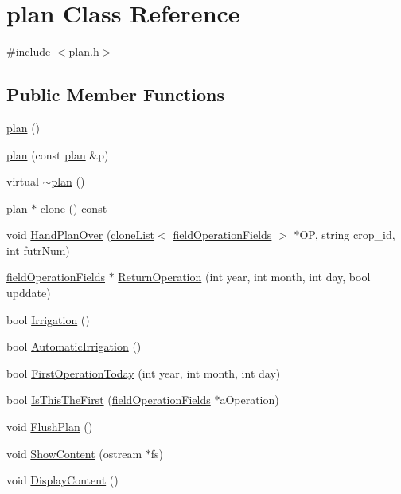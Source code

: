\hypertarget{classplan}{
\section{plan Class Reference}
\label{classplan}
}


{\ttfamily \#include $<$plan.h$>$}\subsection*{Public Member Functions}
\begin{DoxyCompactItemize}
\item 
\hyperlink{classplan_a266f45990dd94064d40cb8e5722120e6}{plan} ()
\item 
\hyperlink{classplan_a74c8e47a3643fc7cc2613d8ad9a05dbb}{plan} (const \hyperlink{classplan}{plan} \&p)
\item 
virtual \hyperlink{classplan_ab23766d95b648190c091e88baa118076}{$\sim$plan} ()
\item 
\hyperlink{classplan}{plan} $\ast$ \hyperlink{classplan_a1734515ada7c0e24914487ddf59268dc}{clone} () const 
\item 
void \hyperlink{classplan_ac480e9366949237b6904a397bfb8b57c}{HandPlanOver} (\hyperlink{classclone_list}{cloneList}$<$ \hyperlink{classfield_operation_fields}{fieldOperationFields} $>$ $\ast$OP, string crop\_\-id, int futrNum)
\item 
\hyperlink{classfield_operation_fields}{fieldOperationFields} $\ast$ \hyperlink{classplan_a5bb316264b932ad51c4af2441691b61d}{ReturnOperation} (int year, int month, int day, bool upddate)
\item 
bool \hyperlink{classplan_ad28041911ab26c91eefbd1105d5922ed}{Irrigation} ()
\item 
bool \hyperlink{classplan_a44d27c54c440253db2ce50369826b3cf}{AutomaticIrrigation} ()
\item 
bool \hyperlink{classplan_aed8d97934d5b9ecb7a30ed937343d7b9}{FirstOperationToday} (int year, int month, int day)
\item 
bool \hyperlink{classplan_adee3da0790a24dcf45690ab53482e45f}{IsThisTheFirst} (\hyperlink{classfield_operation_fields}{fieldOperationFields} $\ast$aOperation)
\item 
void \hyperlink{classplan_a0020926c3203f9d541b259a88b9fed9c}{FlushPlan} ()
\item 
void \hyperlink{classplan_aa904d6cb1887fb97f8e4a10fc13df74b}{ShowContent} (ostream $\ast$fs)
\item 
void \hyperlink{classplan_acc3eb4e92df8fa1142fb2885c15d35de}{DisplayContent} ()

\end{DoxyCompactItemize}
